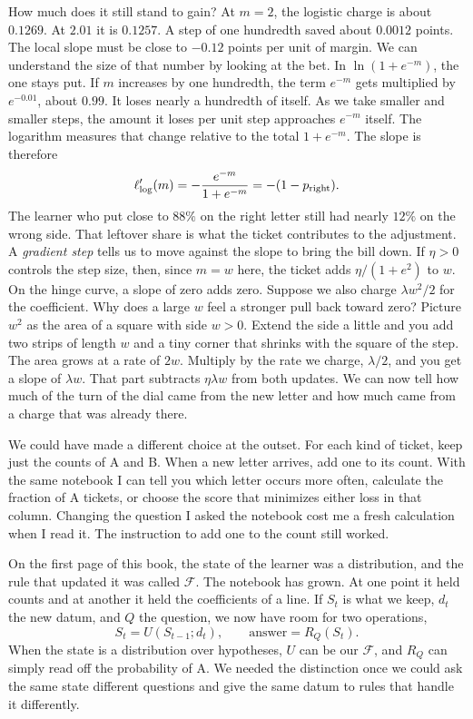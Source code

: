 \documentclass[12pt,oneside]{article}
\newcommand{\bookanchor}[1]{\phantomsection\label{#1}}
\begin{document}
How much does it still stand to gain? At $m=2$, the logistic charge is about $0.1269$. At $2.01$ it is $0.1257$. A step of one hundredth saved about $0.0012$ points. The local slope must be close to $-0.12$ points per unit of margin. We can understand the size of that number by looking at the bet. In $\ln(1+e^{-m})$, the one stays put. If $m$ increases by one hundredth, the term $e^{-m}$ gets multiplied by $e^{-0.01}$, about $0.99$. It loses nearly a hundredth of itself. As we take smaller and smaller steps, the amount it loses per unit step approaches $e^{-m}$ itself. The logarithm measures that change relative to the total $1+e^{-m}$. The slope is therefore
\[
 \ell'_{\rm log}(m)=-\frac{e^{-m}}{1+e^{-m}}=-(1-p_{\rm right}).
\]
The\bookanchor{topic-06-11} learner who put close to $88\%$ on the right letter still had nearly $12\%$ on the wrong side. That leftover share is what the ticket contributes to the adjustment. A \emph{gradient step} tells us to move against the slope to bring the bill down. If $\eta>0$ controls the step size, then, since $m=w$ here, the ticket adds $\eta/(1+e^2)$ to $w$. On the hinge curve, a slope of zero adds zero. Suppose we also charge $\lambda w^2/2$ for the coefficient. Why does a large $w$ feel a stronger pull back toward zero? Picture $w^2$ as the area of a square with side $w>0$. Extend the side a little and you add two strips of length $w$ and a tiny corner that shrinks with the square of the step. The area grows at a rate of $2w$. Multiply by the rate we charge, $\lambda/2$, and you get a slope of $\lambda w$. That part subtracts $\eta\lambda w$ from both updates. We can now tell how much of the turn of the dial came from the new letter and how much came from a charge that was already there.

We could have made a different choice at the outset. For each kind of ticket, keep just the counts of A and B. When a new letter arrives, add one to its count. With the same notebook I can tell you which letter occurs more often, calculate the fraction of A tickets, or choose the score that minimizes either loss in that column. Changing the question I asked the notebook cost me a fresh calculation when I read it. The instruction to add one to the count still worked.

On the first page of this book, the state of the learner was a distribution, and the rule that updated it was called $\mathcal F$. The notebook has grown. At one point it held counts and at another it held the coefficients of a line. If $S_t$ is what we keep, $d_t$ the new datum, and $Q$ the question, we now have room for two operations,
\[
        S_t=U(S_{t-1};d_t),\qquad
        \text{answer}=R_Q(S_t).
\]
When the state is a distribution over hypotheses, $U$ can be our $\mathcal F$, and $R_Q$ can simply read off the probability of A. We needed the distinction once we could ask the same state different questions and give the same datum to rules that handle it differently.
\end{document}
